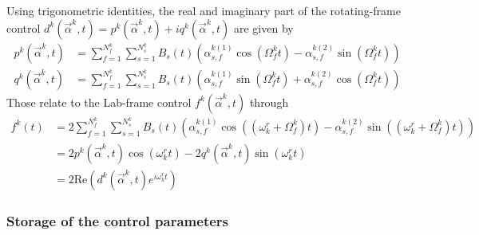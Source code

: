 \documentclass[11pt]{article}
\begin{document}
Using trigonometric identities, the real and imaginary part of the rotating-frame control $d^k(\vec{\alpha}^k,t) = p^k(\vec{\alpha}^k,t) + iq^k(\vec{\alpha}^k,t)$ are given by
\begin{align}
  p^k(\vec{\alpha}^k,t) &= \sum_{f=1}^{N_f^k} \sum_{s=1}^{N_s^k} B_s(t)
  \left(\alpha^{k
  (1)}_{s,f} \cos(\Omega_f^k t) - \alpha^{k (2)}_{s,f} \sin(\Omega_f^k t)
  \right) \\
  q^k(\vec{\alpha}^k,t) &= \sum_{f=1}^{N_f^k} \sum_{s=1}^{N_s^k} B_s(t)\left( \alpha^{k
  (1)}_{s,f} \sin(\Omega_f^k t) + \alpha^{k (2)}_{s,f} \cos(\Omega_f^k t)
  \right)
\end{align}
Those relate to the Lab-frame control $f^k(\vec{\alpha}^k,t)$ through
\begin{align}
  f^k(t) &=  2\sum_{f=1}^{N_f^k} \sum_{s=1}^{N_s^k} B_s(t) \left(\alpha_{s,f}^{k(1)} \cos((\omega_k^{r} + \Omega_f^k) t) - \alpha_{s,f}^{k(2)}\sin((\omega_k^{r} + \Omega_f^k) t) \right) \\
         &= 2 p^k(\vec{\alpha}^k, t) \cos(\omega_k^{r} t) - 2 q^k(\vec{\alpha}^k,
         t)\sin(\omega_k^{r} t) \\
         &= 2\mbox{Re}\left( d^k(\vec{\alpha}^k,t)e^{i\omega_k^r t} \right)
\end{align}

\subsubsection{Storage of the control parameters}
\end{document}
